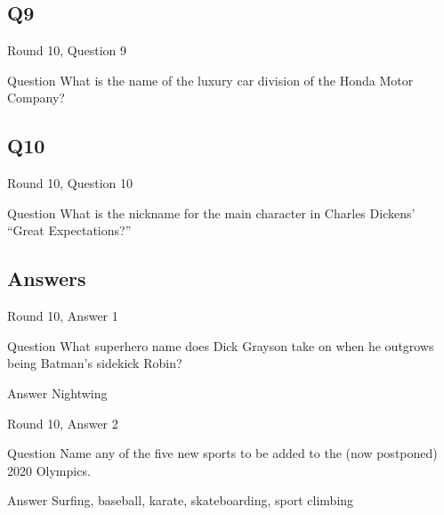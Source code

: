 \documentclass[11pt]{beamer}
\begin{document}
\subsection*{Q9}
\begin{frame}[t]{Round 10, Question 9}
\vspace{2em}
\begin{block}{Question}
What is the name of the luxury car division of the Honda Motor Company\@?
\end{block}
\end{frame}
    

\subsection*{Q10}
\begin{frame}[t]{Round 10, Question 10}
\vspace{2em}
\begin{block}{Question}
What is the nickname for the main character in Charles Dickens' ``Great Expectations?''
\end{block}
\end{frame}
    
\subsection{Answers}

\begin{frame}[t]{Round 10, Answer 1}
\vspace{2em}
\begin{block}{Question}
What superhero name does Dick Grayson take on when he outgrows being Batman's sidekick Robin\@?
\end{block}
\pause{}
\begin{block}{Answer}
Nightwing
\end{block}
\end{frame}
    

\begin{frame}[t]{Round 10, Answer 2}
\vspace{2em}
\begin{block}{Question}
Name any of the five new sports to be added to the (now postponed) 2020 Olympics.
\end{block}
\pause{}
\begin{block}{Answer}
Surfing, baseball, karate, skateboarding, sport climbing
\end{block}
\end{frame}
    
\end{document}
